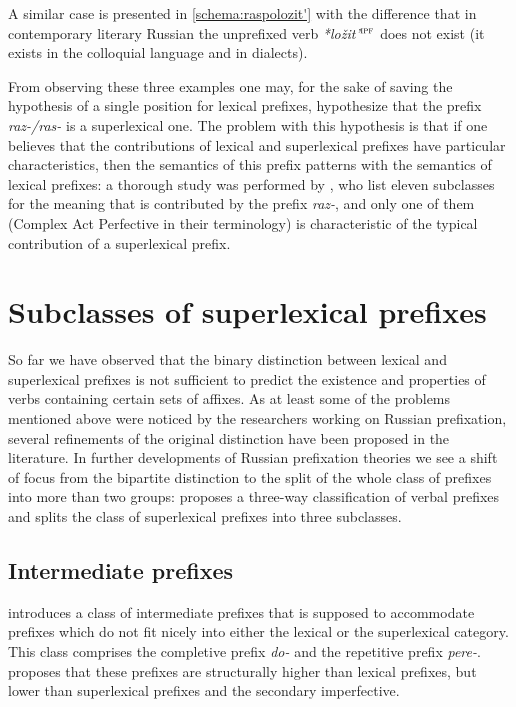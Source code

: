 A similar case is presented in \ref{schema:raspolozit'}
with the difference that in contemporary literary Russian the unprefixed verb \textit{*lo\v{z}it'}$^{\textsc{ipf}}$ does not exist (it exists in the colloquial language and in dialects). 

From observing these three examples one may, for the sake of saving the hypothesis of a single position for lexical prefixes, hypothesize that the prefix \mbox{\textit{raz-/ras-}} is a superlexical one. The problem with this hypothesis is that if one believes that the contributions of lexical and superlexical prefixes have particular characteristics, then the semantics of this prefix patterns with the semantics of lexical prefixes: a thorough study was performed by \citet{JandaNesset:10}, who list eleven subclasses for the meaning that is contributed by the prefix \textit{raz-}, and only one of them (Complex Act Perfective in their terminology) is characteristic of the typical contribution of a superlexical prefix.


\section{Subclasses of superlexical prefixes}\label{section:subclasses}
So far we have observed that the binary distinction between lexical and superlexical prefixes is not sufficient to predict the existence and properties of verbs containing certain sets of affixes. As at least some of the problems mentioned above were noticed by the researchers working on Russian prefixation, several refinements of the original distinction have been proposed in the literature. In further developments of Russian prefixation theories we see a shift of focus from the bipartite distinction to the split of the whole class of prefixes into more than two groups: \citet{Tatevosov:07} proposes a three-way classification of verbal prefixes and \citet{Tatevosov:09} splits the class of superlexical prefixes into three subclasses.

\subsection{Intermediate prefixes}
\cite{Tatevosov:07} introduces a class of intermediate prefixes that is supposed to accommodate prefixes which do not fit nicely into either the lexical or the superlexical category. This class comprises the completive prefix \textit{do-} and the repetitive prefix \textit{pere-}. \citet{Tatevosov:07} proposes that these prefixes are structurally higher than lexical prefixes, but lower than superlexical prefixes and the secondary imperfective. 

